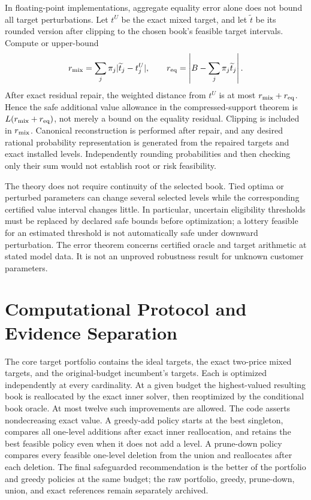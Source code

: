 In floating-point implementations, aggregate equality error alone does not bound all target perturbations. Let $t^U$ be the exact mixed target, and let $\widetilde t$ be its rounded version after clipping to the chosen book's feasible target intervals. Compute or upper-bound
\[
 r_{\rm mix}=\sum_j\pi_j|\widetilde t_j-t_j^U|,
 \qquad r_{\rm eq}=\left|B-\sum_j\pi_j\widetilde t_j\right|.
\]
After exact residual repair, the weighted distance from $t^U$ is at most $r_{\rm mix}+r_{\rm eq}$. Hence the safe additional value allowance in the compressed-support theorem is $L(r_{\rm mix}+r_{\rm eq})$, not merely a bound on the equality residual. Clipping is included in $r_{\rm mix}$. Canonical reconstruction is performed after repair, and any desired rational probability representation is generated from the repaired targets and exact installed levels. Independently rounding probabilities and then checking only their sum would not establish root or risk feasibility.

The theory does not require continuity of the selected book. Tied optima or perturbed parameters can change several selected levels while the corresponding certified value interval changes little. In particular, uncertain eligibility thresholds must be replaced by declared safe bounds before optimization; a lottery feasible for an estimated threshold is not automatically safe under downward perturbation. The error theorem concerns certified oracle and target arithmetic at stated model data. It is not an unproved robustness result for unknown customer parameters.

\section{Computational Protocol and Evidence Separation}\label{ec:r45-protocol}
The core target portfolio contains the ideal targets, the exact two-price mixed targets, and the original-budget incumbent's targets. Each is optimized independently at every cardinality. At a given budget the highest-valued resulting book is reallocated by the exact inner solver, then reoptimized by the conditional book oracle. At most twelve such improvements are allowed. The code asserts nondecreasing exact value. A greedy-add policy starts at the best singleton, compares all one-level additions after exact inner reallocation, and retains the best feasible policy even when it does not add a level. A prune-down policy compares every feasible one-level deletion from the union and reallocates after each deletion. The final safeguarded recommendation is the better of the portfolio and greedy policies at the same budget; the raw portfolio, greedy, prune-down, union, and exact references remain separately archived.

